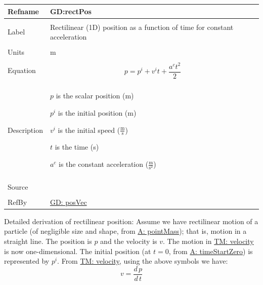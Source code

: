 \documentclass[12pt]{article}
\begin{document}
\noindent \begin{minipage}{\textwidth}
\begin{tabular}{p{} p{}}
\toprule \textbf{Refname} & \textbf{GD:rectPos}
\label{GD:rectPos}
\\ \midrule \\
Label & Rectilinear (1D) position as a function of time for constant acceleration
\\ \midrule \\
Units & m
\\ \midrule \\
Equation & \begin{displaymath}
           p={p^{i}}+{v^{i}} t+\frac{{a^{c}} t^{2}}{2}
           \end{displaymath}
\\ \midrule \\
Description & \begin{symbDescription}
              \item{$p$ is the scalar position (m)}
              \item{${p^{i}}$ is the initial position (m)}
              \item{${v^{i}}$ is the initial speed ($\frac{\text{m}}{\text{s}}$)}
              \item{$t$ is the time (s)}
              \item{${a^{c}}$ is the constant acceleration ($\frac{\text{m}}{\text{s}^{2}}$)}
              \end{symbDescription}
\\ \midrule \\
Source & \cite[(pg. 8)]{hibbeler2004}
\\ \midrule \\
RefBy & \hyperref[GD:posVec]{GD: posVec}
\\ \bottomrule \end{tabular}
\end{minipage}
Detailed derivation of rectilinear position:
Assume we have rectilinear motion of a particle (of negligible size and shape, from \hyperref[pointMass]{A: pointMass}); that is, motion in a straight line. The position is $p$ and the velocity is $v$. The motion in \hyperref[TM:velocity]{TM: velocity} is now one-dimensional. The initial position (at $t=0$, from \hyperref[timeStartZero]{A: timeStartZero}) is represented by ${p^{i}}$. From \hyperref[TM:velocity]{TM: velocity}, using the above symbols we have:
\begin{displaymath}
v=\frac{d\,p}{d\,t}
\end{displaymath}
\end{document}
